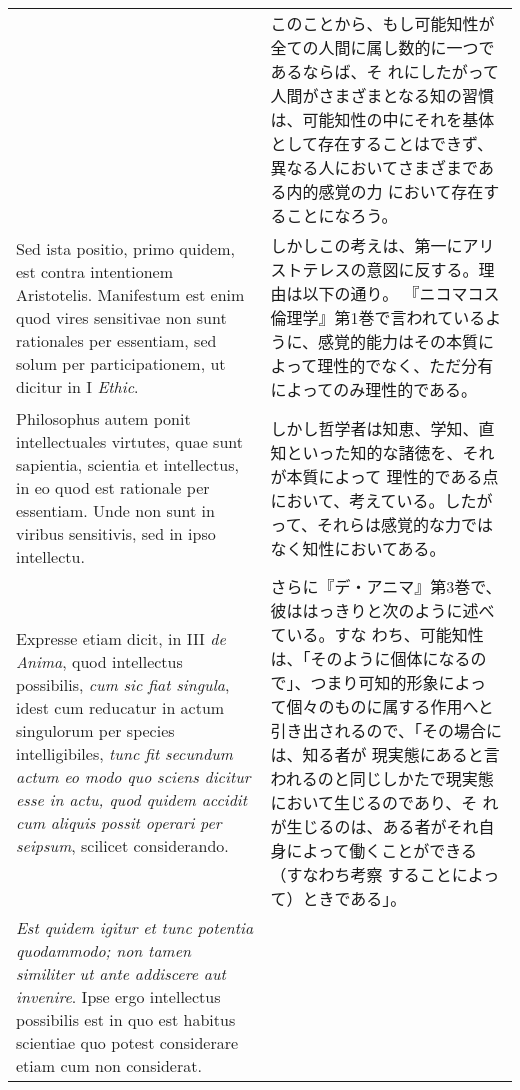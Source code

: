 \documentclass[10pt]{jsarticle} %
\begin{document}
\begin{longtable}{p{21em}p{21em}}
&

このことから、もし可能知性が全ての人間に属し数的に一つであるならば、そ
れにしたがって人間がさまざまとなる知の習慣は、可能知性の中にそれを基体
として存在することはできず、異なる人においてさまざまである内的感覚の力
において存在することになろう。


\\

Sed ista positio, primo quidem, est contra intentionem
Aristotelis. Manifestum est enim quod vires sensitivae non sunt
rationales per essentiam, sed solum per participationem, ut dicitur in
I {\itshape Ethic}.

&

しかしこの考えは、第一にアリストテレスの意図に反する。理由は以下の通り。
『ニコマコス倫理学』第1巻で言われているように、感覚的能力はその本質に
よって理性的でなく、ただ分有によってのみ理性的である。


\\

Philosophus autem ponit intellectuales virtutes, quae sunt sapientia,
scientia et intellectus, in eo quod est rationale per essentiam. Unde
non sunt in viribus sensitivis, sed in ipso intellectu.

&

しかし哲学者は知恵、学知、直知といった知的な諸徳を、それが本質によって
理性的である点において、考えている。したがって、それらは感覚的な力では
なく知性においてある。

\\


Expresse etiam dicit, in III {\itshape de Anima}, quod intellectus possibilis,
{\itshape cum sic fiat singula}, idest cum reducatur in actum singulorum per
species intelligibiles, {\itshape tunc fit secundum actum eo modo quo sciens
dicitur esse in actu, quod quidem accidit cum aliquis possit operari
per seipsum}, scilicet considerando.

&

さらに『デ・アニマ』第3巻で、彼ははっきりと次のように述べている。すな
わち、可能知性は、「そのように個体になるので」、つまり可知的形象によっ
て個々のものに属する作用へと引き出されるので、「その場合には、知る者が
現実態にあると言われるのと同じしかたで現実態において生じるのであり、そ
れが生じるのは、ある者がそれ自身によって働くことができる（すなわち考察
することによって）ときである」。


\\

{\itshape Est quidem igitur et tunc potentia quodammodo; non tamen
similiter ut ante addiscere aut invenire}. Ipse ergo intellectus
possibilis est in quo est habitus scientiae quo potest considerare
etiam cum non considerat.


\end{longtable}
\end{document}
